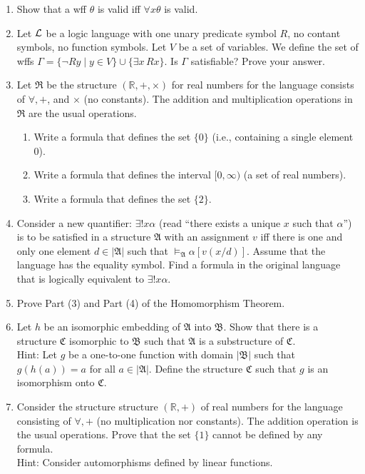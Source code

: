 \documentclass[12pt,letterpaper]{article}
\def\faA{\mathfrak{A}}
\def\faB{\mathfrak{B}}
\def\faC{\mathfrak{C}}
\begin{document}
\begin{enumerate}
\item
  Show that a wff $\theta$ is valid iff $\forall x \theta$ is valid.

\item
  Let $\cal L$ be a logic language with one unary predicate
  symbol $R$, no contant symbols, no function symbols.
  Let $V$ be a set of variables.
  We define the set of wffs
  $\Gamma=\{\neg Ry\mid y\in V\}\cup\{\exists x\,Rx\}$.
  Is $\Gamma$ satisfiable? Prove your answer.

\item
  Let $\mathfrak{R}$ be
  the structure $({\mathbb R}, +, \times)$ for real numbers
  for the language consists of $\forall, +$, and $\times$
  (no constants).
  The addition and multiplication operations in $\mathfrak{R}$
  are the usual operations.
  \vspace*{-2mm}
  \begin{enumerate}\itemsep 0pt
  \item
    Write a formula that defines the set $\{0\}$
    (i.e., containing a single element $0$).
  \item
    Write a formula that defines the interval $[0,\infty)$
    (a set of real numbers).
  \item
    Write a formula that defines the set $\{2\}$.
  \end{enumerate}

\item
  Consider a new quantifier: $\exists!x\alpha$
  (read ``there exists a unique $x$ such that $\alpha$'')
  is to be satisfied in a structure $\faA$ with an assignment $v$
  iff there is one and only one element $d\in|\faA|$ such that
  $\models_{\faA}\alpha[v(x/d)]$.
  Assume that the language has the equality symbol.
  Find a formula in the original language that
  is logically equivalent to $\exists!x\alpha$.

\item
  Prove Part (3) and Part (4) of the Homomorphism Theorem.

\item
  Let $h$ be an isomorphic embedding of $\faA$ into $\faB$.
  Show that there is a structure $\faC$ isomorphic to $\faB$
  such that $\faA$ is a substructure of $\faC$.\\
  Hint:
  Let $g$ be a one-to-one function with domain $|\faB|$  such that
  $g(h(a))=a$ for all $a\in|\faA|$.
  Define the structure $\faC$ such that
  $g$ is an isomorphism onto $\faC$.

\item
  Consider the structure structure $({\mathbb R}, +)$
  of real numbers for the language
  consisting of $\forall, +$ (no multiplication
  nor constants).
  The addition operation is the usual operations.
  Prove that the set $\{1\}$ cannot be defined by any formula.
  \\
  Hint: Consider automorphisms defined by linear functions.
\end{enumerate}
\end{document}

